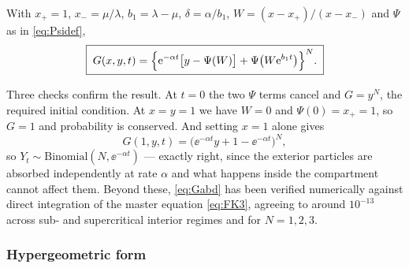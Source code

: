 \begin{proposition}
\label{prop:Gabd}
With $x_+=1$, $x_-=\mu/\lambda$, $b_1 = \lambda-\mu$, $\delta = \alpha/b_1$,
$W = (x-x_+)/(x-x_-)$ and $\Psi$ as in \cref{eq:Psidef},
\begin{equation}
\label{eq:Gabd}
\boxed{\;
G(x,y,t) = \Bigl\{\mathrm{e}^{-\alpha t}\bigl[y-\Psi(W)\bigr] + \Psi\bigl(W\mathrm{e}^{b_1t}\bigr)\Bigr\}^{N}. \;}
\end{equation}
\end{proposition}

Three checks confirm the result. At $t=0$ the two $\Psi$ terms cancel and $G=y^N$,
the required initial condition. At $x=y=1$ we have $W=0$ and $\Psi(0)=x_+=1$, so
$G=1$ and probability is conserved. And setting $x=1$ alone gives
\begin{equation*}
G(1,y,t) = \bigl(\ee^{-\alpha t}y + 1-\ee^{-\alpha t}\bigr)^N,
\end{equation*}
so $Y_t\sim\text{Binomial}(N,\ee^{-\alpha t})$ --- exactly right, since the
exterior particles are absorbed independently at rate $\alpha$ and what happens
inside the compartment cannot affect them. Beyond these, \cref{eq:Gabd} has been
verified numerically against direct integration of the master equation
\cref{eq:FK3}, agreeing to around $10^{-13}$ across sub- and supercritical interior
regimes and for $N=1,2,3$.

\subsubsection*{Hypergeometric form}

